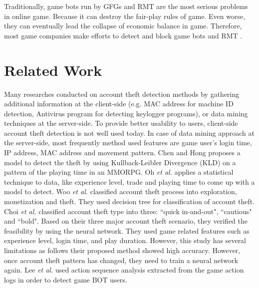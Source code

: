 \documentclass[conference]{IEEEtran}
\begin{document}
Traditionally, game bots run by GFGs and RMT are the most serious problems in online game. Because it can destroy the fair-play rules of game. Even worse, they can eventually lead the collapse of economic balance in game. Therefore, most game companies make efforts to detect and block game bots and RMT \cite{lee2016you}. %

\section{Related Work}
\label{section:related}
Many researches conducted on account theft detection methods by gathering additional information at the client-side (e.g. MAC address for machine ID detection, Antivirus program for detecting keylogger programs), or data mining techniques at the server-side. To provide better usability to users, client-side account theft detection is not well used today. In case of data mining approach at the server-side, most frequently method used features are game user's login time, IP address, MAC address and movement pattern. Chen and Hong \cite{chen2007user} proposes a model to detect the theft by using Kullback-Leibler Divergence (KLD) on a pattern of the playing time in an MMORPG. Oh \texttt{}{\itshape et al.} \cite{oh2012automatic} applies a statistical technique to data, like experience level, trade and playing time to come up with a model to detect. %
Woo \texttt{}{\itshape et al.} \cite{woo2012automatic} classified account theft process into exploration, monetization and theft. They used decision tree for classification of account theft. Choi \texttt{}{\itshape et al.}\cite{choi2011detecting} classified account theft type into three: ``quick in-and-out", ``cautious" and ``bold". Based on their three major account theft scenario, they verified the feasibility by using the neural network. They used game related features such as experience level, login time, and play duration. However, this study has several limitations as follows their proposed method showed high accuracy. However, once account theft pattern has changed, they need to train a neural network again. %
Lee \texttt{}{\itshape et al.} \cite{lee2015game} used action sequence analysis extracted from the game action logs in order to detect game BOT users.  
\end{document}
